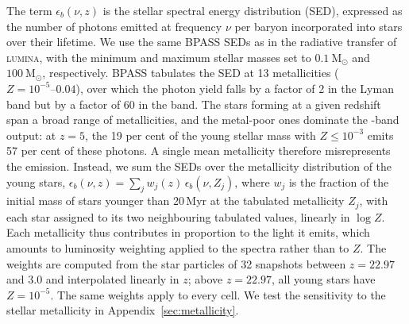 \documentclass[apj,twocolumn, appendixfloats, twocolappendix, numberedappendix, tighten]{openjournal}
\DeclareRobustCommand{\lumina}{\mbox{\textsc{lumina}}\xspace}
\begin{document}
\begin{appendix}
The term $\epsilon_b(\nu, z)$ is the stellar spectral energy distribution (SED), expressed as the number of photons emitted at frequency $\nu$ per baryon incorporated into stars over their lifetime. We use the same BPASS SEDs as in the radiative transfer of \lumina, with the minimum and maximum stellar masses set to $0.1~\mathrm{M}_\odot$ and $100~\mathrm{M}_\odot$, respectively. BPASS tabulates the SED at 13 metallicities ($Z = 10^{-5}\text{--}0.04$), over which the photon yield falls by a factor of 2 in the  Lyman band but by a factor of 60 in the  band. The stars forming at a given redshift span a broad range of metallicities, and the metal-poor ones dominate the -band output: at $z = 5$, the 19 per cent of the young stellar mass with $Z \leq 10^{-3}$ emits 57 per cent of these photons. A single mean metallicity therefore misrepresents the emission. Instead, we sum the SEDs over the metallicity distribution of the young stars, $\epsilon_b(\nu, z) = \sum_j w_j(z)\, \epsilon_b(\nu, Z_j)$, where $w_j$ is the fraction of the initial mass of stars younger than 20\,Myr at the tabulated metallicity $Z_j$, with each star assigned to its two neighbouring tabulated values, linearly in $\log Z$. Each metallicity thus contributes in proportion to the light it emits, which amounts to luminosity weighting applied to the spectra rather than to $Z$. The weights are computed from the star particles of 32 snapshots between $z = 22.97$ and $3.0$ and interpolated linearly in $z$; above $z = 22.97$, all young stars have $Z = 10^{-5}$. The same weights apply to every cell. We test the sensitivity to the stellar metallicity in Appendix~\ref{sec:metallicity}.


\end{appendix}
\end{document}
